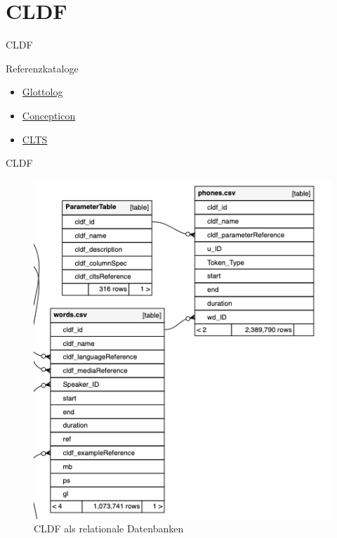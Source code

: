 \section{CLDF}
\begin{frame}{CLDF}
\begin{block}{Referenzkataloge}
	\begin{itemize}
		\item \href{https://glottolog.org/}{Glottolog}
		\item \href{https://concepticon.clld.org/}{Concepticon}
		\item \href{https://clts.clld.org/}{CLTS}
	\end{itemize}
\end{block}
\end{frame}

\begin{frame}{CLDF}
\vspace*{-0.3cm}
	\begin{figure}
		\includegraphics[height=0.75\textheight]{images/relational.png}
		\caption{CLDF als relationale Datenbanken \parencite{Forkel2018}}
	\end{figure}
\end{frame}
	

